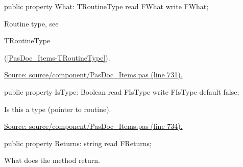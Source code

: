 \documentclass{report}
\newif\ifpdf
\begin{document}
\begin{list}{}{
\setlength{\itemindent}{0cm}
\setlength{\listparindent}{0cm}
\setlength{\leftmargin}{\evensidemargin}
\addtolength{\leftmargin}{\tmplength}
\settowidth{\labelsep}{X}
\addtolength{\leftmargin}{\labelsep}
\setlength{\labelwidth}{\tmplength}
}
\label{PasDoc_Items.TPasRoutine-What}
\item[\textbf{What}\hfill]
\ifpdf
\begin{flushleft}
\fi
\begin{ttfamily}
public property What: TRoutineType read FWhat write FWhat;\end{ttfamily}

\ifpdf
\end{flushleft}
\fi


\par Routine type, see \begin{ttfamily}TRoutineType\end{ttfamily}(\ref{PasDoc_Items-TRoutineType}).\par
\href{https://github.com/pasdoc/pasdoc/blob/master/source/component/PasDoc_Items.pas#L731}{Source: source/component/PasDoc{\_}Items.pas (line 731).}\label{PasDoc_Items.TPasRoutine-IsType}
\item[\textbf{IsType}\hfill]
\ifpdf
\begin{flushleft}
\fi
\begin{ttfamily}
public property IsType: Boolean read FIsType write FIsType default false;\end{ttfamily}

\ifpdf
\end{flushleft}
\fi


\par Is this a type (pointer to routine).\par
\href{https://github.com/pasdoc/pasdoc/blob/master/source/component/PasDoc_Items.pas#L734}{Source: source/component/PasDoc{\_}Items.pas (line 734).}\label{PasDoc_Items.TPasRoutine-Returns}
\item[\textbf{Returns}\hfill]
\ifpdf
\begin{flushleft}
\fi
\begin{ttfamily}
public property Returns: string read FReturns;\end{ttfamily}

\ifpdf
\end{flushleft}
\fi


\par What does the method return.


\end{list}
\end{document}

